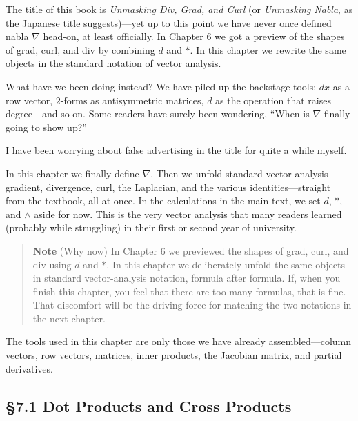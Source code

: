 \documentclass[a4paper,12pt,openany]{book}
\begin{document}
The title of this book is \emph{Unmasking Div, Grad, and Curl} (or
\emph{Unmasking Nabla}, as the Japanese title suggests)—yet up to this
point we have never once defined nabla \(\nabla\) head-on, at least
officially. In Chapter 6 we got a preview of the shapes of grad, curl,
and div by combining \(d\) and \(\ast\). In this chapter we rewrite the
same objects in the standard notation of vector analysis.

What have we been doing instead? We have piled up the backstage tools:
\(dx\) as a row vector, \(2\)-forms as antisymmetric matrices, \(d\) as
the operation that raises degree—and so on. Some readers have surely
been wondering, ``When is \(\nabla\) finally going to show up?''

I have been worrying about false advertising in the title for quite a
while myself.

In this chapter we finally define \(\nabla\). Then we unfold standard
vector analysis—gradient, divergence, curl, the Laplacian, and the
various identities—straight from the textbook, all at once. In the
calculations in the main text, we set \(d\), \(\ast\), and \(\wedge\)
aside for now. This is the very vector analysis that many readers
learned (probably while struggling) in their first or second year of
university.

\begin{quote}
\textbf{Note} (Why now) In Chapter 6 we previewed the shapes of grad,
curl, and div using \(d\) and \(\ast\). In this chapter we deliberately
unfold the same objects in standard vector-analysis notation, formula
after formula. If, when you finish this chapter, you feel that there are
too many formulas, that is fine. That discomfort will be the driving
force for matching the two notations in the next chapter.
\end{quote}

The tools used in this chapter are only those we have already
assembled—column vectors, row vectors, matrices, inner products, the
Jacobian matrix, and partial derivatives.

\par\vspace{0.35em}\par

\hypertarget{dot-products-and-cross-products}{%
\subsection{§7.1 Dot Products and Cross
Products}\label{dot-products-and-cross-products}}
\end{document}
